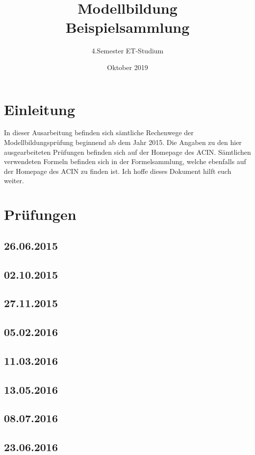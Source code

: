 \documentclass[a4paper,12p]{article}
\title{\huge Modellbildung\\\large \huge Beispielsammlung}
\author{\huge 4.Semester ET-Studium}
\date{\huge Oktober 2019}
\begin{document}
	\maketitle
	\newpage
	\tableofcontents
	\newpage
	
	\section{Einleitung}
	In dieser Ausarbeitung befinden sich sämtliche Rechenwege der Modellbildungsprüfung beginnend ab dem Jahr 2015. Die Angaben zu den hier ausgearbeiteten Prüfungen befinden sich auf der Homepage des ACIN. Sämtlichen verwendeten Formeln befinden sich in der Formelsammlung, welche ebenfalls auf der Homepage des ACIN zu finden ist. Ich hoffe dieses Dokument hilft euch weiter. 
	
	\section{Prüfungen}
	
	\subsection{26.06.2015}
	
	
	\newpage
	\subsection{02.10.2015}
	\subsection{27.11.2015}
	\subsection{05.02.2016}
	\subsection{11.03.2016}
	\subsection{13.05.2016}
	\subsection{08.07.2016}
	\subsection{23.06.2016}
\end{document}
